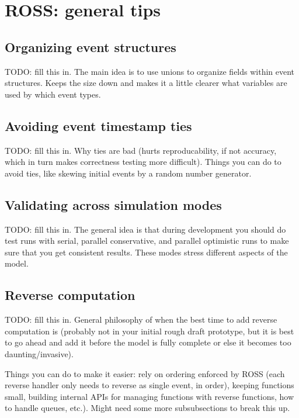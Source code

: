 \documentclass[conference,10pt,compsocconf,onecolumn]{IEEEtran}
\begin{document}
\section{ROSS: general tips}

\subsection{Organizing event structures}

TODO: fill this in.  The main idea is to use unions to organize fields
within event structures.  Keeps the size down and makes it a little clearer
what variables are used by which event types.

\subsection{Avoiding event timestamp ties}

TODO: fill this in.   Why ties are bad (hurts reproducability, if not
accuracy, which in turn makes correctness testing more difficult).  Things
you can do to avoid ties, like skewing initial events by a random number
generator.

\subsection{Validating across simulation modes}

TODO: fill this in.  The general idea is that during development you should
do test runs with serial, parallel conservative, and parallel optimistic
runs to make sure that you get consistent results.  These modes stress
different aspects of the model.

\subsection{Reverse computation}

TODO: fill this in.  General philosophy of when the best time to add reverse
computation is (probably not in your initial rough draft prototype, but it
is best to go ahead and add it before the model is fully complete or else it
becomes too daunting/invasive).

Things you can do to make it easier: rely on ordering enforced by ROSS (each
reverse handler only needs to reverse as single event, in order), keeping functions small, building
internal APIs for managing functions with reverse functions, how to handle
queues, etc.).  Might need some more subsubsections to break this up.
\end{document}
